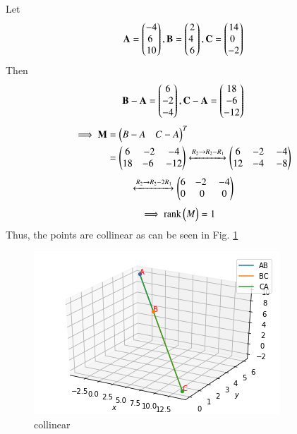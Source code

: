 Let 
\begin{align}
\vec{A} = \myvec{-4 \\ 6 \\ 10} , \vec{B} = \myvec{2 \\ 4 \\6} , \vec{C} = \myvec{14 \\ 0 \\ -2}
\end{align}
Then 
\begin{align}
\mathbf{B-A}= \begin{pmatrix}6\\-2\\-4\end{pmatrix},
\mathbf{C-A}=\begin{pmatrix}18\\-6\\-12\end{pmatrix}
\end{align}
\begin{align}
\implies \vec{M} &= \vec{\myvec{B-A  & C-A}}^T
\\
 &= \myvec{6 & -2 & -4\\18 & -6 & -12} 
\xleftrightarrow {R_2 \rightarrow R_2-R_1}\myvec{6 & -2 & -4 \\12 & -4 & -8}
\end{align}
\begin{align}
\xleftrightarrow{R_2\rightarrow R_2-2R_1}\myvec{6 & -2 & -4 \\0 & 0 & 0}
\end{align}
\begin{align}
\implies \text{rank} \begin{pmatrix}M\end{pmatrix} &=1
\end{align}
Thus, the points are collinear as can be seen in Fig. \ref{vec/2/27/fig: collinear}	
\begin{figure}[!ht]
\centering
\includegraphics[width=\columnwidth]{solutions/su2021/2/27/Figure6.png}
\caption{collinear}
\label{vec/2/27/fig: collinear}	
\end{figure}
